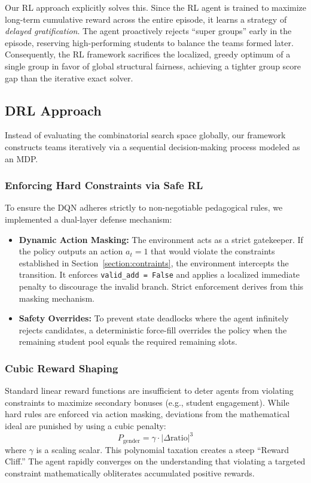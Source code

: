 \documentclass{icai2026} %
\begin{document}
Our RL approach explicitly solves this. Since the RL agent is trained to maximize long-term cumulative reward across the entire episode, it learns a strategy of \emph{delayed gratification}. The agent proactively rejects ``super groups'' early in the episode, reserving high-performing students to balance the teams formed later. Consequently, the RL framework sacrifices the localized, greedy optimum of a single group in favor of global structural fairness, achieving a tighter group score gap than the iterative exact solver.

\subsection{DRL Approach}

Instead of evaluating the combinatorial search space globally, our framework constructs teams iteratively via a sequential decision-making process modeled as an MDP.

\subsubsection{Enforcing Hard Constraints via Safe RL}
To ensure the DQN adheres strictly to non-negotiable pedagogical rules, we implemented a dual-layer defense mechanism:
\begin{itemize}
    \item \textbf{Dynamic Action Masking:} The environment acts as a strict gatekeeper. If the policy outputs an action $a_t=1$ that would violate the constraints established in Section~\ref{section:contraints}, the environment intercepts the transition. It enforces \texttt{valid\_add = False} and applies a localized immediate penalty to discourage the invalid branch. Strict enforcement derives from this masking mechanism.
    \item \textbf{Safety Overrides:} To prevent state deadlocks where the agent infinitely rejects candidates, a deterministic force-fill overrides the policy when the remaining student pool equals the required remaining slots.
\end{itemize}

\subsubsection{Cubic Reward Shaping}
Standard linear reward functions are insufficient to deter agents from violating constraints to maximize secondary bonuses (e.g., student engagement). While hard rules are enforced via action masking, deviations from the mathematical ideal are punished by using a cubic penalty:
\begin{equation} \label{eq:cubic_penalty}
    P_{\text{gender}} = \gamma \cdot | \Delta \text{ratio} |^3
\end{equation}
where $\gamma$ is a scaling scalar. This polynomial taxation creates a steep ``Reward Cliff.'' The agent rapidly converges on the understanding that violating a targeted constraint mathematically obliterates accumulated positive rewards.
\end{document}
